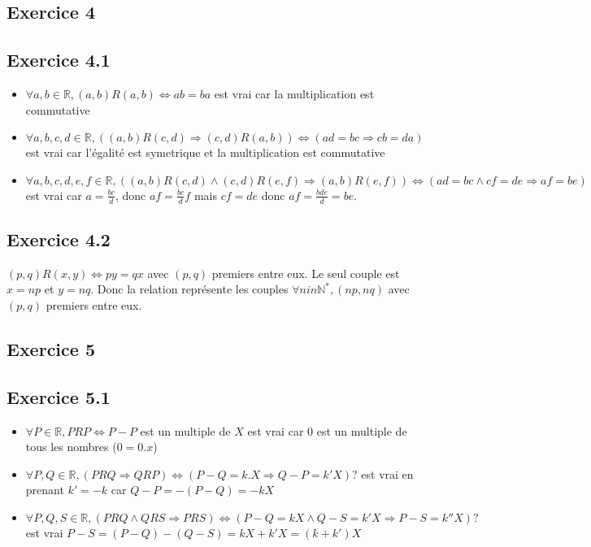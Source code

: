 \documentclass[]{book}
\theoremstyle{definition}
\newcommand{\bb}[1]{\mathbb{#1}}
\newcommand{\R}{\bb{R}}
\newcommand{\N}{\bb{N}}
\begin{document}
\subsection*{Exercice 4}
\subsection*{Exercice 4.1}
\begin{itemize}
\item $\forall a,b \in \R, (a,b)R(a,b) \Leftrightarrow ab = ba$ est vrai car la multiplication est commutative
\item $\forall a,b,c,d \in \R, ((a,b)R(c,d) \Rightarrow (c,d)R(a,b)) \Leftrightarrow (ad = bc \Rightarrow cb = da)$ est vrai car l'\'egalit\'e est symetrique et la multiplication est commutative
\item $\forall a,b,c,d,e,f \in \R, ((a,b)R(c,d) \wedge (c,d)R(e,f) \Rightarrow (a,b)R(e,f)) \Leftrightarrow (ad = bc \wedge cf = de \Rightarrow af = be)$ est vrai car $a = \frac{bc}{d}$, donc $af = \frac{bc}{d}f$ mais $cf=de$ donc $af = \frac{bde}{d} = be$. 
\end{itemize}

\subsection*{Exercice 4.2}
$(p,q)R(x,y) \Leftrightarrow py = qx$ avec $(p,q)$ premiers entre eux. Le seul couple est $x=np$ et $y=nq$. Donc la relation repr\'esente les couples $\forall n in \N^{*},(np,nq)$ avec $(p,q)$ premiers entre eux.


\subsection*{Exercice 5}
\subsection*{Exercice 5.1}
\begin{itemize}
\item $\forall P \in \R, PRP \Leftrightarrow P-P$ est un multiple de $X$ est vrai car 0 est un multiple de tous les nombres ($0 = 0.x$)
\item $\forall P,Q \in \R, (PRQ \Rightarrow QRP) \Leftrightarrow (P-Q = k.X \Rightarrow Q-P = k'X)?$ est vrai en prenant $k'=-k$ car $Q-P = -(P-Q) = -kX$ 
\item $\forall P,Q,S \in \R, (PRQ \wedge QRS \Rightarrow PRS) \Leftrightarrow (P-Q = kX \wedge Q-S = k'X \Rightarrow P-S = k''X)?$ est vrai $P-S = (P-Q) - (Q-S) = kX + k'X = (k+k')X$
\end{itemize}
\end{document}
